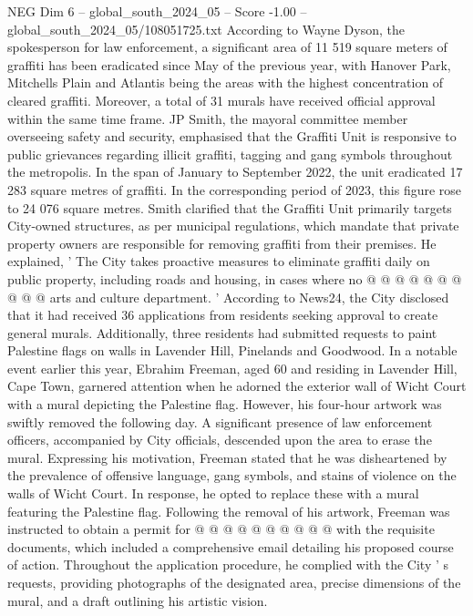 \begin{textsample}{NEG Dim 6 – global\_south\_2024\_05 – Score -1.00 – global\_south\_2024\_05/108051725.txt}  \label{ex:f6_neg_238}
According to Wayne Dyson, the spokesperson for law enforcement, a significant area of 11 519 square meters of graffiti has been eradicated since May of the previous year, with Hanover Park, Mitchells Plain and Atlantis being the areas with the highest concentration of cleared graffiti.
Moreover, a total of 31 murals have received official approval within the same time frame.
JP Smith, the mayoral committee member overseeing safety and security, emphasised that the Graffiti Unit is responsive to public grievances regarding illicit graffiti, tagging and gang symbols throughout the metropolis.
In the span of January to September 2022, the unit eradicated 17 283 square metres of graffiti.
In the corresponding period of 2023, this figure rose to 24 076 square metres.
Smith clarified that the Graffiti Unit primarily targets City-owned structures, as per municipal regulations, which mandate that private property owners are responsible for removing graffiti from their premises.
He explained, ' The City takes proactive measures to eliminate graffiti daily on public property, including roads and housing, in cases where no @ @ @ @ @ @ @ @ @ @ arts and culture department. ' According to News24, the City disclosed that it had received 36 applications from residents seeking approval to create general murals.
Additionally, three residents had submitted requests to paint Palestine flags on walls in Lavender Hill, Pinelands and Goodwood.
In a notable event earlier this year, Ebrahim Freeman, aged 60 and residing in Lavender Hill, Cape Town, garnered attention when he adorned the exterior wall of Wicht Court with a mural depicting the Palestine flag.
However, his four-hour artwork was swiftly removed the following day.
A significant presence of law enforcement officers, accompanied by City officials, descended upon the area to erase the mural.
Expressing his motivation, Freeman stated that he was disheartened by the prevalence of offensive language, gang symbols, and stains of violence on the walls of Wicht Court.
In response, he opted to replace these with a mural featuring the Palestine flag.
Following the removal of his artwork, Freeman was instructed to obtain a permit for @ @ @ @ @ @ @ @ @ @ with the requisite documents, which included a comprehensive email detailing his proposed course of action.
Throughout the application procedure, he complied with the City ' s requests, providing photographs of the designated area, precise dimensions of the mural, and a draft outlining his artistic vision.

\end{textsample}
